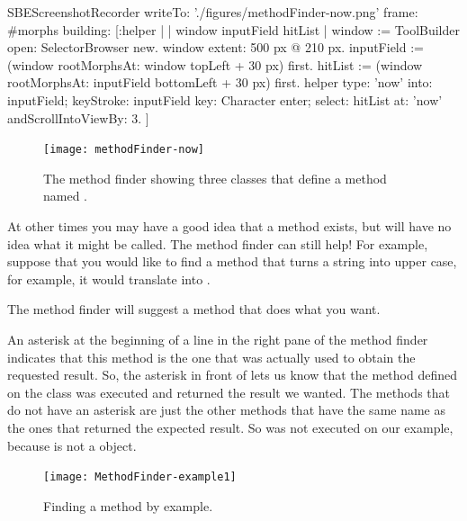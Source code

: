 \documentclass[a4paper,10pt,twoside]{book}
\begin{document}
\begin{ExecuteSmalltalkScript}
SBEScreenshotRecorder writeTo: './figures/methodFinder-now.png' frame: #morphs building: [:helper |
	| window inputField hitList |
	window := ToolBuilder open: SelectorBrowser new.
	window extent: 500 px @ 210 px.
	inputField := (window rootMorphsAt: window topLeft + 30 px) first.
	hitList := (window rootMorphsAt: inputField bottomLeft + 30 px) first.
	helper
		type: 'now' into: inputField;
		keyStroke: inputField key: Character enter;
		select: hitList at: 'now' andScrollIntoViewBy: 3.
]
\end{ExecuteSmalltalkScript}

\begin{figure}[hbt]
\centerline {\texttt{[image: methodFinder-now]}}
\caption{The method finder showing three classes that define a method named .
\label{fig:MethodFinder}}
\end{figure}

At other times you may have a good idea that a method exists, but will have no idea what it might be called.
The method finder can still help!
For example, suppose that you would like to find a method that turns a string into upper case, for example, it would translate  into .

\noindent
The method finder will suggest a method that does what you want.

An asterisk at the beginning of a line in the right pane of the method finder indicates that this method is the one that was actually used to obtain the requested result.
So, the asterisk in front of  lets us know that the method  defined on the class  was executed and returned the result we wanted.
The methods that do not have an asterisk are just the other methods that have the same name as the ones that returned the expected result.
So  was not executed on our example, because  is not a  object.

\begin{figure}[hbt]
\centerline {\texttt{[image: MethodFinder-example1]}}
\caption{Finding a method by example.
\label{fig:methodFinder-example1}}
\end{figure}
\end{document}
